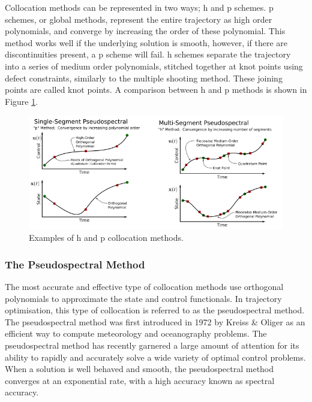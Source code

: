 Collocation methods can be represented in two ways; \textsf{h} and \textsf{p} schemes\cite{Kelly2015}. \textsf{p} schemes, or global methods, represent the entire trajectory as high order polynomials, and converge by increasing the order of these polynomial\cite{Kelly2015}. This method works well if the underlying solution is smooth, however, if there are discontinuities present, a \textsf{p} scheme will fail\cite{Kelly2015}. \textsf{h} schemes separate the trajectory into a series of medium order polynomials, stitched together at knot points using defect constraints, similarly to the multiple shooting method\cite{Kelly2015,Rao2009,Ross2004}. These joining points are called knot points\cite{Kelly2015,Ross2004}. A comparison between \textsf{h} and \textsf{p} methods is shown in Figure \ref{fig:HPExamples}.

\begin{figure}[ht]
	\centering
	\includegraphics[width=0.9\linewidth]{figures/2_literature-review/HPExamples}
	\caption{Examples of \textsf{h} and \textsf{p} collocation methods\cite{Kelly2015}.}
	\label{fig:HPExamples}
\end{figure}

\subsubsection{The Pseudospectral Method}\label{sec:PS}


The most accurate and effective type of collocation methods use orthogonal polynomials to approximate the state and control functionals\cite{Fahroo2000}. In trajectory optimisation, this type of collocation is referred to as the pseudospectral method\cite{Kelly2015}. 
The pseudospectral method was first introduced in 1972 by Kreiss \& Oliger\cite{Kreiss1972} as an efficient way to compute meteorology and oceanography problems. The pseudospectral method has recently garnered a large amount of attention for its ability to rapidly and accurately solve a wide variety of optimal control problems.  When a solution is well behaved and smooth, the pseudospectral method converges at an exponential rate, with a high accuracy known as spectral accuracy\cite{Ross2004,Darby2011a}. 

